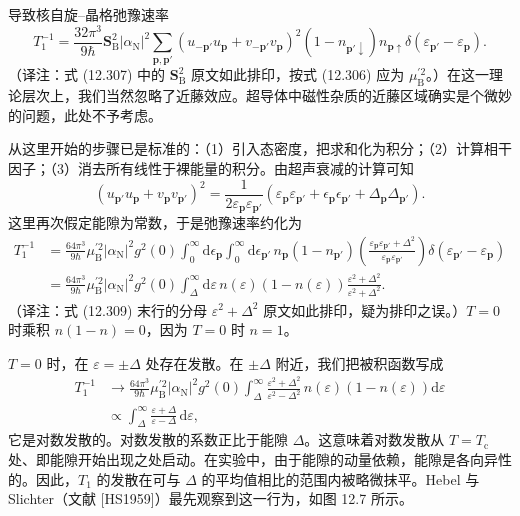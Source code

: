 导致核自旋–晶格弛豫速率
\begin{equation*}
T_{1}^{-1}=\frac{32\pi^{3}}{9\hbar}\mathbf{S}_{\mathrm{B}}^{2}\left|\alpha_{\mathrm{N}}\right|^{2}\sum_{\mathbf{p},\mathbf{p}'}\left(u_{-\mathbf{p}'}u_{\mathbf{p}}+v_{-\mathbf{p}'}v_{\mathbf{p}}\right)^{2}\left(1-n_{\mathbf{p}'\downarrow}\right)n_{\mathbf{p}\uparrow}\delta\left(\varepsilon_{\mathbf{p}'}-\varepsilon_{\mathbf{p}}\right).\tag{12.307}
\end{equation*}
（译注：式 (12.307) 中的 $\mathbf{S}_{\mathrm{B}}^{2}$ 原文如此排印，按式 (12.306) 应为 $\mu_{\mathrm{B}}^{\prime 2}$。）在这一理论层次上，我们当然忽略了近藤效应。超导体中磁性杂质的近藤区域确实是个微妙的问题，此处不予考虑。

从这里开始的步骤已是标准的：（1）引入态密度，把求和化为积分；（2）计算相干因子；（3）消去所有线性于裸能量的积分。由超声衰减的计算可知
\begin{equation*}
\left(u_{\mathbf{p}'}u_{\mathbf{p}}+v_{\mathbf{p}}v_{\mathbf{p}'}\right)^{2}=\frac{1}{2\varepsilon_{\mathbf{p}}\varepsilon_{\mathbf{p}'}}\left(\varepsilon_{\mathbf{p}}\varepsilon_{\mathbf{p}'}+\epsilon_{\mathbf{p}}\epsilon_{\mathbf{p}'}+\Delta_{\mathbf{p}}\Delta_{\mathbf{p}'}\right).\tag{12.308}
\end{equation*}
这里再次假定能隙为常数，于是弛豫速率约化为
\begin{align*}
T_{1}^{-1}&=\frac{64\pi^{3}}{9\hbar}\mu_{\mathrm{B}}^{\prime 2}\left|\alpha_{\mathrm{N}}\right|^{2}g^{2}(0)\int_{0}^{\infty}\mathrm{d}\epsilon_{\mathbf{p}}\int_{0}^{\infty}\mathrm{d}\epsilon_{\mathbf{p}'}\,n_{\mathbf{p}}\left(1-n_{\mathbf{p}'}\right)\left(\frac{\varepsilon_{\mathbf{p}}\varepsilon_{\mathbf{p}'}+\Delta^{2}}{\varepsilon_{\mathbf{p}}\varepsilon_{\mathbf{p}'}}\right)\delta\left(\varepsilon_{\mathbf{p}'}-\varepsilon_{\mathbf{p}}\right)\\
&=\frac{64\pi^{3}}{9\hbar}\mu_{\mathrm{B}}^{\prime 2}\left|\alpha_{\mathrm{N}}\right|^{2}g^{2}(0)\int_{\Delta}^{\infty}\mathrm{d}\varepsilon\,n(\varepsilon)\left(1-n(\varepsilon)\right)\frac{\varepsilon^{2}+\Delta^{2}}{\varepsilon^{2}+\Delta^{2}}.\tag{12.309}
\end{align*}
（译注：式 (12.309) 末行的分母 $\varepsilon^{2}+\Delta^{2}$ 原文如此排印，疑为排印之误。）$T=0$ 时乘积 $n(1-n)=0$，因为 $T=0$ 时 $n=1$。

$T=0$ 时，在 $\varepsilon=\pm\Delta$ 处存在发散。在 $\pm\Delta$ 附近，我们把被积函数写成
\begin{align*}
T_{1}^{-1}&\to\frac{64\pi^{3}}{9\hbar}\mu_{\mathrm{B}}^{\prime 2}\left|\alpha_{\mathrm{N}}\right|^{2}g^{2}(0)\int_{\Delta}^{\infty}\frac{\varepsilon^{2}+\Delta^{2}}{\varepsilon^{2}-\Delta^{2}}\,n(\varepsilon)\left(1-n(\varepsilon)\right)\mathrm{d}\varepsilon\\
&\propto\int_{\Delta}^{\infty}\frac{\varepsilon+\Delta}{\varepsilon-\Delta}\,\mathrm{d}\varepsilon,\tag{12.310}
\end{align*}
它是对数发散的。对数发散的系数正比于能隙 $\Delta$。这意味着对数发散从 $T=T_{\mathrm{c}}$ 处、即能隙开始出现之处启动。在实验中，由于能隙的动量依赖，能隙是各向异性的。因此，$T_{1}$ 的发散在可与 $\Delta$ 的平均值相比的范围内被略微抹平。Hebel 与 Slichter（文献 [HS1959]）最先观察到这一行为，如图 12.7 所示。


